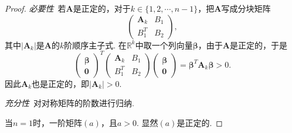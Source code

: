 \documentclass{article}
\newcommand{\mbf}[1]{\bm{#1}}
\begin{document}
\begin{proof}
\emph{必要性}\ 若$\mbf{A}$是正定的，对于$k \in \{1,2,\cdots,n-1\}$，把$\mbf{A}$写成分块矩阵
$$
\begin{pmatrix}
\mbf{A}_k & B_1 \\
B_1^T & B_2 
\end{pmatrix},
$$
其中$|\mbf{A}_k|$是$\mbf{A}$的$k$阶顺序主子式. 在$\mathbb{R}^k$中取一个列向量$\mbf{\beta}$，由于$\mbf{A}$是正定的，于是
$$
\begin{pmatrix}
\mbf{\beta} \\
\mbf{0} 
\end{pmatrix}^T
\begin{pmatrix}
\mbf{A}_k & B_1 \\
B_1^T & B_2 
\end{pmatrix}
\begin{pmatrix}
\mbf{\beta} \\
\mbf{0} 
\end{pmatrix} = \mbf{\beta}^T\mbf{A}_k\mbf{\beta} > 0. 
$$
因此$\mbf{A}_k$也是正定的，即$|\mbf{A}_k| > 0$. 

\emph{充分性}\ 对对称矩阵的阶数进行归纳.

当$n=1$时，一阶矩阵$(a)$，且$a > 0$. 显然$(a)$是正定的.


\end{proof}
\end{document}
